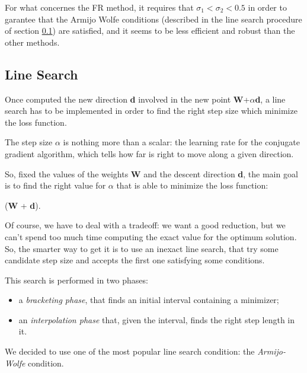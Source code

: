 			For what concernes the FR method, it requires that $\sigma_1 < \sigma_2 < 0.5$ in order to garantee that the Armijo Wolfe conditions (described in the line search procedure of section \ref{sub:line_search}) are satisfied, and it seems to be less efficient and robust than the other methods.





		\subsection{Line Search} %
		\label{sub:line_search}
			Once computed the new direction \textbf{d} involved in the new point \textbf{W}+$\alpha$\textbf{d}, a line search has to be implemented in order to find the right step size which minimize the loss function.

			The step size $\alpha$ is nothing more than a scalar: the learning rate for the conjugate gradient algorithm, which tells how far is right to move along a given direction. 

			So, fixed the values of the weights \textbf{W} and the descent direction \textbf{d}, the main goal is to find the right value for $\alpha$ that is able to minimize the loss function:

			 \begin{mini} 
			   {\alpha}{(\textbf{W} + \alpha\textbf{d}).}{}{}
			    \end{mini}

			Of course, we have to deal with a tradeoff: we want a good reduction, but we can't spend too much time computing the exact value for the optimum solution. So, the smarter way to get it is to use an inexact line search, that try some candidate step size and accepts the first one satisfying some conditions.  

			This search is performed in two phases: 
			\begin{itemize}
			\item a \textit{bracketing phase}, that finds an initial interval containing a minimizer;
			\item an \textit{interpolation phase} that, given the interval, finds the right step length in it.
			\end{itemize}

			We decided to use one of the most popular line search condition: the \textit{Armijo-Wolfe} condition.

